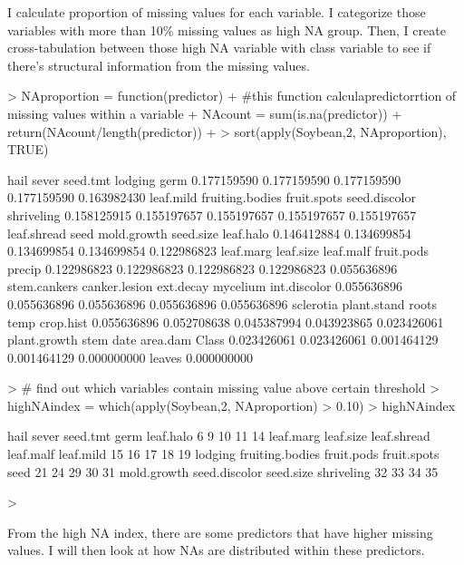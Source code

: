\documentclass[12pt]{article}
\begin{document}
\begin{itemize}
I calculate proportion of missing values for each variable. I categorize those variables with more than 10\% missing values as high NA group. Then, I create cross-tabulation between those high NA variable with class variable to see if there's structural information from the missing values. 

\begin{Schunk}
\begin{Sinput}
> NAproportion = function(predictor){
+   #this function calculapredictorrtion of missing values within a variable
+   NAcount = sum(is.na(predictor))
+   return(NAcount/length(predictor))
+ }
> sort(apply(Soybean,2, NAproportion), TRUE)
\end{Sinput}
\begin{Soutput}
           hail           sever        seed.tmt         lodging            germ 
    0.177159590     0.177159590     0.177159590     0.177159590     0.163982430 
      leaf.mild fruiting.bodies     fruit.spots   seed.discolor      shriveling 
    0.158125915     0.155197657     0.155197657     0.155197657     0.155197657 
    leaf.shread            seed     mold.growth       seed.size       leaf.halo 
    0.146412884     0.134699854     0.134699854     0.134699854     0.122986823 
      leaf.marg       leaf.size       leaf.malf      fruit.pods          precip 
    0.122986823     0.122986823     0.122986823     0.122986823     0.055636896 
   stem.cankers   canker.lesion       ext.decay        mycelium    int.discolor 
    0.055636896     0.055636896     0.055636896     0.055636896     0.055636896 
      sclerotia     plant.stand           roots            temp       crop.hist 
    0.055636896     0.052708638     0.045387994     0.043923865     0.023426061 
   plant.growth            stem            date        area.dam           Class 
    0.023426061     0.023426061     0.001464129     0.001464129     0.000000000 
         leaves 
    0.000000000 
\end{Soutput}
\begin{Sinput}
> # find out which variables contain missing value above certain threshold
> highNAindex = which(apply(Soybean,2, NAproportion) > 0.10)
> highNAindex
\end{Sinput}
\begin{Soutput}
           hail           sever        seed.tmt            germ       leaf.halo 
              6               9              10              11              14 
      leaf.marg       leaf.size     leaf.shread       leaf.malf       leaf.mild 
             15              16              17              18              19 
        lodging fruiting.bodies      fruit.pods     fruit.spots            seed 
             21              24              29              30              31 
    mold.growth   seed.discolor       seed.size      shriveling 
             32              33              34              35 
\end{Soutput}
\begin{Sinput}
> 
\end{Sinput}
\end{Schunk}
From the high NA index, there are some predictors that have higher missing values.
I will then look at how NAs are distributed within these predictors.


\end{itemize}
\end{document}
